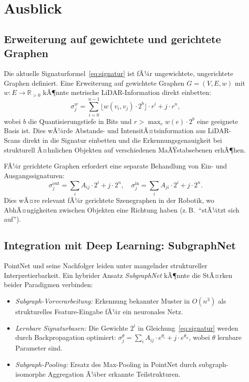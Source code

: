 ﻿\documentclass[a4paper,12pt]{article}
\theoremstyle{definition}
\begin{document}
\section{Ausblick}

\subsection{Erweiterung auf gewichtete und gerichtete Graphen}

Die aktuelle Signaturformel~\eqref{eq:signatur} ist fÃ¼r ungewichtete,
ungerichtete Graphen definiert. Eine Erweiterung auf gewichtete Graphen
$G = (V, E, w)$ mit $w: E \to \mathbb{R}_{>0}$ kÃ¶nnte metrische
LiDAR-Information direkt einbetten:
\[
  \sigma_j^w = \sum_{i=0}^{n-1} \lfloor w(v_i, v_j) \cdot 2^b \rfloor
               \cdot r^i + j \cdot r^n,
\]
wobei $b$ die Quantisierungstiefe in Bits und $r > \max_e w(e) \cdot
2^b$ eine geeignete Basis ist. Dies wÃ¼rde Abstands- und
IntensitÃ¤tsinformation aus LiDAR-Scans direkt in die Signatur
einbetten und die Erkennungsgenauigkeit bei strukturell Ã¤hnlichen
Objekten auf verschiedenen MaÃŸstabsebenen erhÃ¶hen.

FÃ¼r gerichtete Graphen erfordert eine separate Behandlung von
Ein- und Ausgangssignaturen:
\[
  \sigma_j^{\mathrm{out}} = \sum_i A_{ij} \cdot 2^i + j \cdot 2^n,
  \quad
  \sigma_j^{\mathrm{in}}  = \sum_i A_{ji} \cdot 2^i + j \cdot 2^n.
\]
Dies wÃ¤re relevant fÃ¼r gerichtete Szenegraphen in der Robotik,
wo AbhÃ¤ngigkeiten zwischen Objekten eine Richtung haben
(z.\,B.\ ``stÃ¼tzt sich auf'').

\subsection{Integration mit Deep Learning: SubgraphNet}

PointNet \citep{Qi2017} und seine Nachfolger leiden unter mangelnder
struktureller Interpretierbarkeit. Ein hybrider Ansatz
\emph{SubgraphNet} kÃ¶nnte die StÃ¤rken beider Paradigmen verbinden:

\begin{itemize}
  \item \emph{Subgraph-Vorverarbeitung:} Erkennung bekannter Muster
        in $O(n^3)$ als strukturelles Feature-Eingabe fÃ¼r ein neuronales
        Netz.
  \item \emph{Lernbare Signaturbasen:} Die Gewichte $2^i$ in
        Gleichung~\eqref{eq:signatur} werden durch Backpropagation
        optimiert: $\sigma_j^\theta = \sum_i A_{ij} \cdot e^{\theta_i}
        + j \cdot e^{\theta_n}$, wobei $\theta$ lernbare Parameter sind.
  \item \emph{Subgraph-Pooling:} Ersatz des Max-Pooling in PointNet
        durch subgraph-isomorphe Aggregation Ã¼ber erkannte Teilstrukturen.
\end{itemize}
\end{document}

